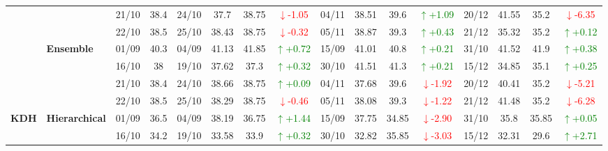\documentclass{ieeeaccess}
\begin{document}
{\begin{longtable}{llcc|cccc|cccc|cccc}
& 
& 21/10 & 38.4 & 24/10 & 37.7 & 38.75 & \textcolor{red}{\(\downarrow\)-1.05} & 04/11 & 38.51 & 39.6 & \textcolor{green}{\(\uparrow\)+1.09} & 20/12 & 41.55 & 35.2 & \textcolor{red}{\(\downarrow\)-6.35} \\

&
& 22/10 & 38.5 & 25/10 & 38.43 & 38.75 & \textcolor{red}{\(\downarrow\)-0.32} & 05/11 & 38.87 & 39.3 & \textcolor{green}{\(\uparrow\)+0.43} & 21/12 & 35.32 & 35.2 & \textcolor{green}{\(\uparrow\)+0.12} \\
\cmidrule(lr){2-16}


& \textbf{Ensemble}
& 01/09 & 40.3 & 04/09 & 41.13 & 41.85 & \textcolor{green}{\(\uparrow\)+0.72} & 15/09 & 41.01 & 40.8 & \textcolor{green}{\(\uparrow\)+0.21} & 31/10 & 41.52 & 41.9 & \textcolor{green}{\(\uparrow\)+0.38} \\

& 
& 16/10 & 38 & 19/10 & 37.62 & 37.3 & \textcolor{green}{\(\uparrow\)+0.32} & 30/10 & 41.51 & 41.3 & \textcolor{green}{\(\uparrow\)+0.21} & 15/12 & 34.85 & 35.1 & \textcolor{green}{\(\uparrow\)+0.25} \\

& 
& 21/10 & 38.4 & 24/10 & 38.66 & 38.75 & \textcolor{green}{\(\uparrow\)+0.09} & 04/11 & 37.68 & 39.6 & \textcolor{red}{\(\downarrow\)-1.92} & 20/12 & 40.41 & 35.2 & \textcolor{red}{\(\downarrow\)-5.21} \\

&
& 22/10 & 38.5 & 25/10 & 38.29 & 38.75 & \textcolor{red}{\(\downarrow\)-0.46} & 05/11 & 38.08 & 39.3 & \textcolor{red}{\(\downarrow\)-1.22} & 21/12 & 41.48 & 35.2 & \textcolor{red}{\(\downarrow\)-6.28} \\
\midrule



\multirow{12}{*}{\textbf{KDH}} 
& \textbf{Hierarchical}
& 01/09 & 36.5 & 04/09 & 38.19 & 36.75 & \textcolor{green}{\(\uparrow\)+1.44} & 15/09 & 37.75 & 34.85 & \textcolor{red}{\(\downarrow\)-2.90} & 31/10 & 35.8 & 35.85 & \textcolor{green}{\(\uparrow\)+0.05} \\

&
& 16/10 & 34.2 & 19/10 & 33.58 & 33.9 & \textcolor{green}{\(\uparrow\)+0.32} & 30/10 & 32.82 & 35.85 & \textcolor{red}{\(\downarrow\)-3.03} & 15/12 & 32.31 & 29.6 & \textcolor{green}{\(\uparrow\)+2.71} \\


\end{longtable}}
\end{document}
